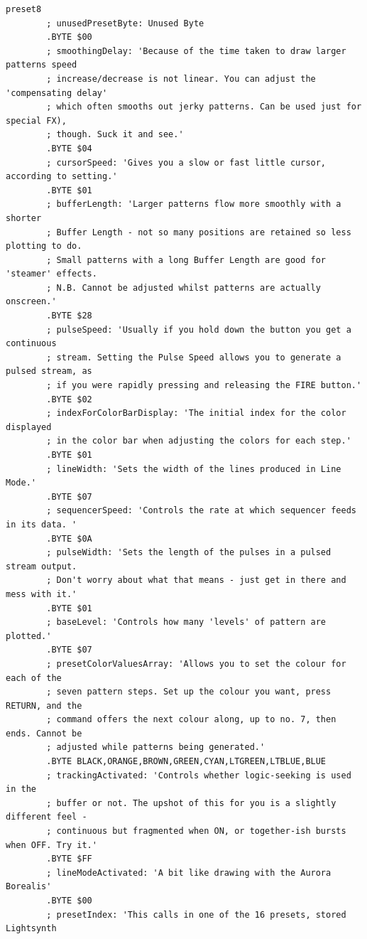 \begin{lstlisting}[basicstyle=\tiny,caption=Source code for Preset 8.]
preset8
        ; unusedPresetByte: Unused Byte
        .BYTE $00
        ; smoothingDelay: 'Because of the time taken to draw larger patterns speed
        ; increase/decrease is not linear. You can adjust the 'compensating delay'
        ; which often smooths out jerky patterns. Can be used just for special FX),
        ; though. Suck it and see.'
        .BYTE $04
        ; cursorSpeed: 'Gives you a slow or fast little cursor, according to setting.'
        .BYTE $01
        ; bufferLength: 'Larger patterns flow more smoothly with a shorter
        ; Buffer Length - not so many positions are retained so less plotting to do.
        ; Small patterns with a long Buffer Length are good for 'steamer' effects.
        ; N.B. Cannot be adjusted whilst patterns are actually onscreen.'
        .BYTE $28
        ; pulseSpeed: 'Usually if you hold down the button you get a continuous
        ; stream. Setting the Pulse Speed allows you to generate a pulsed stream, as
        ; if you were rapidly pressing and releasing the FIRE button.'
        .BYTE $02
        ; indexForColorBarDisplay: 'The initial index for the color displayed
        ; in the color bar when adjusting the colors for each step.'
        .BYTE $01
        ; lineWidth: 'Sets the width of the lines produced in Line Mode.'
        .BYTE $07
        ; sequencerSpeed: 'Controls the rate at which sequencer feeds in its data. '
        .BYTE $0A
        ; pulseWidth: 'Sets the length of the pulses in a pulsed stream output.
        ; Don't worry about what that means - just get in there and mess with it.'
        .BYTE $01
        ; baseLevel: 'Controls how many 'levels' of pattern are plotted.'
        .BYTE $07
        ; presetColorValuesArray: 'Allows you to set the colour for each of the
        ; seven pattern steps. Set up the colour you want, press RETURN, and the
        ; command offers the next colour along, up to no. 7, then ends. Cannot be
        ; adjusted while patterns being generated.'
        .BYTE BLACK,ORANGE,BROWN,GREEN,CYAN,LTGREEN,LTBLUE,BLUE
        ; trackingActivated: 'Controls whether logic-seeking is used in the
        ; buffer or not. The upshot of this for you is a slightly different feel -
        ; continuous but fragmented when ON, or together-ish bursts when OFF. Try it.'
        .BYTE $FF
        ; lineModeActivated: 'A bit like drawing with the Aurora Borealis'
        .BYTE $00
        ; presetIndex: 'This calls in one of the 16 presets, stored Lightsynth

\end{lstlisting}
